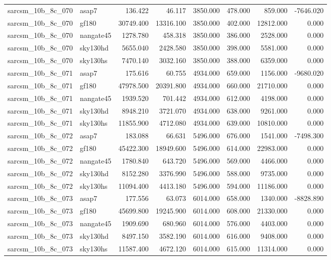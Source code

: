 \begin{tabular}{llrrrrrr}
sarcsm\_10b\_8c\_070 & asap7 & 136.422 & 46.117 & 3850.000 & 478.000 & 859.000 & -7646.020 \\
sarcsm\_10b\_8c\_070 & gf180 & 30749.400 & 13316.100 & 3850.000 & 402.000 & 12812.000 & 0.000 \\
sarcsm\_10b\_8c\_070 & nangate45 & 1278.780 & 458.318 & 3850.000 & 386.000 & 2528.000 & 0.000 \\
sarcsm\_10b\_8c\_070 & sky130hd & 5655.040 & 2428.580 & 3850.000 & 398.000 & 5581.000 & 0.000 \\
sarcsm\_10b\_8c\_070 & sky130hs & 7470.140 & 3032.160 & 3850.000 & 388.000 & 6359.000 & 0.000 \\
sarcsm\_10b\_8c\_071 & asap7 & 175.616 & 60.755 & 4934.000 & 659.000 & 1156.000 & -9680.020 \\
sarcsm\_10b\_8c\_071 & gf180 & 47978.500 & 20391.800 & 4934.000 & 660.000 & 21710.000 & 0.000 \\
sarcsm\_10b\_8c\_071 & nangate45 & 1939.520 & 701.442 & 4934.000 & 612.000 & 4198.000 & 0.000 \\
sarcsm\_10b\_8c\_071 & sky130hd & 8948.210 & 3721.070 & 4934.000 & 638.000 & 9261.000 & 0.000 \\
sarcsm\_10b\_8c\_071 & sky130hs & 11855.900 & 4712.080 & 4934.000 & 639.000 & 10810.000 & 0.000 \\
sarcsm\_10b\_8c\_072 & asap7 & 183.088 & 66.631 & 5496.000 & 676.000 & 1541.000 & -7498.300 \\
sarcsm\_10b\_8c\_072 & gf180 & 45422.300 & 18949.600 & 5496.000 & 614.000 & 22983.000 & 0.000 \\
sarcsm\_10b\_8c\_072 & nangate45 & 1780.840 & 643.720 & 5496.000 & 569.000 & 4466.000 & 0.000 \\
sarcsm\_10b\_8c\_072 & sky130hd & 8152.280 & 3376.990 & 5496.000 & 588.000 & 9735.000 & 0.000 \\
sarcsm\_10b\_8c\_072 & sky130hs & 11094.400 & 4413.180 & 5496.000 & 594.000 & 11186.000 & 0.000 \\
sarcsm\_10b\_8c\_073 & asap7 & 177.556 & 63.073 & 6014.000 & 658.000 & 1340.000 & -8828.890 \\
sarcsm\_10b\_8c\_073 & gf180 & 45699.800 & 19245.900 & 6014.000 & 608.000 & 21330.000 & 0.000 \\
sarcsm\_10b\_8c\_073 & nangate45 & 1909.690 & 680.960 & 6014.000 & 576.000 & 4403.000 & 0.000 \\
sarcsm\_10b\_8c\_073 & sky130hd & 8497.150 & 3582.190 & 6014.000 & 616.000 & 9408.000 & 0.000 \\
sarcsm\_10b\_8c\_073 & sky130hs & 11587.400 & 4672.120 & 6014.000 & 615.000 & 11314.000 & 0.000 \\

\end{tabular}
